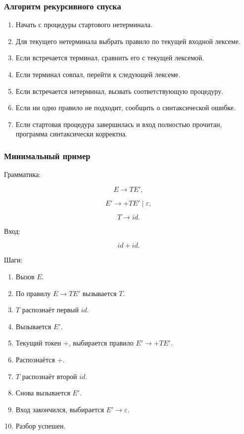 \documentclass[12pt,a4paper]{article}
\begin{document}
\subsubsection{Алгоритм рекурсивного спуска}

\begin{enumerate}
    \item Начать с процедуры стартового нетерминала.
    \item Для текущего нетерминала выбрать правило по текущей входной лексеме.
    \item Если встречается терминал, сравнить его с текущей лексемой.
    \item Если терминал совпал, перейти к следующей лексеме.
    \item Если встречается нетерминал, вызвать соответствующую процедуру.
    \item Если ни одно правило не подходит, сообщить о синтаксической ошибке.
    \item Если стартовая процедура завершилась и вход полностью прочитан, программа синтаксически корректна.
\end{enumerate}

\subsubsection{Минимальный пример}

Грамматика:

\[
E \to T E',
\]

\[
E' \to + T E' \mid \varepsilon,
\]

\[
T \to id.
\]

Вход:

\[
id + id.
\]

Шаги:
\begin{enumerate}
    \item Вызов $E$.
    \item По правилу $E \to T E'$ вызывается $T$.
    \item $T$ распознаёт первый $id$.
    \item Вызывается $E'$.
    \item Текущий токен $+$, выбирается правило $E'\to +TE'$.
    \item Распознаётся $+$.
    \item $T$ распознаёт второй $id$.
    \item Снова вызывается $E'$.
    \item Вход закончился, выбирается $E'\to\varepsilon$.
    \item Разбор успешен.
\end{enumerate}
\end{document}
